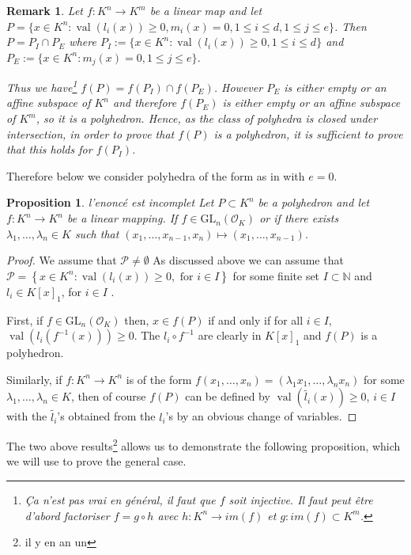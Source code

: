 \documentclass[a4paper,12pt]{article}
\newtheorem{proposition}[theorem]{Proposition}
\newtheorem{remark}[theorem]{Remark}
\newcommand{\N}{\mathbb{N}} %
\newcommand{\PP}{\mathcal{P}}
\newcommand{\simone}[1]{{\color{blue} #1}} %
\DeclareMathOperator{\val}{val}
\newcommand{\OK}{\mathcal{O}_K}
\newcommand{\GL}{\mathrm{GL}}
\begin{document}
\begin{remark}
  Let $f : K^n \to K^m$ be a linear map and let
  $P = \{x \in K^n : \val(l_i(x)) \geq 0, m_i(x) = 0, 1 \leq i \leq d, 1 \leq j \leq e\}$.
  Then $P = P_I \cap P_E$ where $P_I := \{x \in K^n : \val(l_i(x)) \geq 0, 1 \leq i \leq d\}$
  and $P_E := \{x \in K^n : m_j(x) = 0, 1 \leq j \leq e\}$.

  Thus we have\footnote{\simone{Ça n'est pas vrai en général, il faut que $f$ soit injective.
    Il faut peut être d'abord factoriser $f = g \circ h$ avec $h : K^n \to im(f)$ et
    $g : im(f) \subset K^m$.}}
  $f(P) = f(P_I) \cap f(P_E)$. However $P_E$ is either empty or an affine subspace of
  $K^n$ and therefore $f(P_E)$ is either empty or an affine subspace of $K^m$, so it is a polyhedron.
  Hence, as the class of polyhedra is closed under intersection, in order to prove that
  $f(P)$ is a polyhedron, it is sufficient to prove that this holds for $f(P_I)$.
\end{remark}

Therefore below we consider polyhedra of the form as in  with $e=0$.

\begin{proposition}\simone{l'enoncé est incomplet}
  Let $P \subset K^n$ be a polyhedron and let $f : K^n \to K^n$ be a linear mapping.
  If $f \in \GL_n(\OK)$ or if there exists $\lambda_1, \dots, \lambda_n \in K$ such that
  $(x_1,\dots,x_{n-1}, x_n) \mapsto (x_1,\dots, x_{n-1})$.
\end{proposition}

\begin{proof}
We assume that $\PP \neq \emptyset$
As discussed above we can assume that
$\PP = \left\lbrace x \in K^n : \val (l_i (x) ) \geq 0,\textrm{ for } i \in I \right\rbrace$ for some
finite set $I \subset \N$ and $l_i \in K[x]_1$, for $i \in I$ .

First, if $f \in \GL_n(\OK)$ then, $x \in f(P)$ if and only if for all $i \in I$, 
$\val(l_i (f^{-1}(x))) \geq 0$.
The $l_i \circ f^{-1}$ are clearly in $K[x]_1$
and $f(P)$ is a polyhedron.

Similarly, if $f:K^n \rightarrow K^n$ is of the form
$f(x_1,\dots,x_n)=(\lambda_1 x_1,\dots,\lambda_n x_n)$
for some $\lambda_1,\ldots, \lambda_n \in K$,
then of course $f(P)$
can be defined by $\val (\widetilde{l_i}(x)) \geq 0$, $i \in I$
with the $\widetilde{l_i}$'s obtained from the $l_i$'s by an
obvious change of variables.
\end{proof}

The two above results\footnote{\simone{il y en an un}}
allows us to demonstrate the following proposition, which we will use to prove the general case. 
\end{document}
